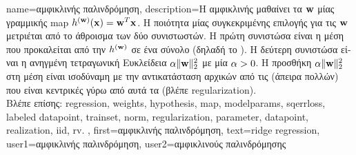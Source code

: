 {name={\foreignlanguage{greek}{αμφικλινής παλινδρόμηση}}, 
	description={\foreignlanguage{greek}{Η αμφικλινής} 
		 \foreignlanguage{greek}{μαθαίνει τα}  ${\bf w}$ \foreignlanguage{greek}{μίας γραμμικής} \gls{map} 
		 $h^{({\bf w})}({\bf x})= {\bf w}^{T} {\bf x}$. \foreignlanguage{greek}{Η ποιότητα  
		μίας συγκεκριμένης επιλογής για τις}  ${\bf w}$ \foreignlanguage{greek}{μετριέται από το άθροισμα  
		των δύο συνιστωστών. Η πρώτη συνιστώσα είναι η μέση}  
		\foreignlanguage{greek}{που προκαλείται από την $h^{({\bf w})}$ σε ένα σύνολο}
		 \foreignlanguage{greek}{(δηλαδή το} ). \foreignlanguage{greek}{Η δεύτερη συνιστώσα είναι  
		η ανηγμένη τετραγωνική Ευκλείδεια}  $\alpha \| {\bf w} \|^{2}_{2}$ \foreignlanguage{greek}{με μία}  
		 $\alpha > 0$. \foreignlanguage{greek}{Η προσθήκη $\alpha \| {\bf w} \|^{2}_{2}$ στη μέση} 
	    	 \foreignlanguage{greek}{είναι ισοδύναμη με την αντικατάσταση αρχικών}  \foreignlanguage{greek}{από τις} 
	    	 \foreignlanguage{greek}{(άπειρα πολλών)}   \foreignlanguage{greek}{που είναι 
		κεντρικές γύρω από αυτά τα}  \foreignlanguage{greek}{(βλέπε} \gls{regularization}).\\
	    	\foreignlanguage{greek}{Βλέπε επίσης:} \gls{regression}, \gls{weights}, \gls{hypothesis}, \gls{map}, \gls{modelparams}, \gls{sqerrloss}, \gls{labeled datapoint}, 
		\gls{trainset}, \gls{norm}, \gls{regularization}, \gls{parameter}, \gls{datapoint}, \gls{realization}, \gls{iid}, \gls{rv}. },
	    first={\foreignlanguage{greek}{αμφικλινής παλινδρόμηση}},
	    text={ridge regression},
	    user1={\foreignlanguage{greek}{αμφικλινής παλινδρόμηση}}, %
	    user2={\foreignlanguage{greek}{αμφικλινούς παλινδρόμησης}} %
}

